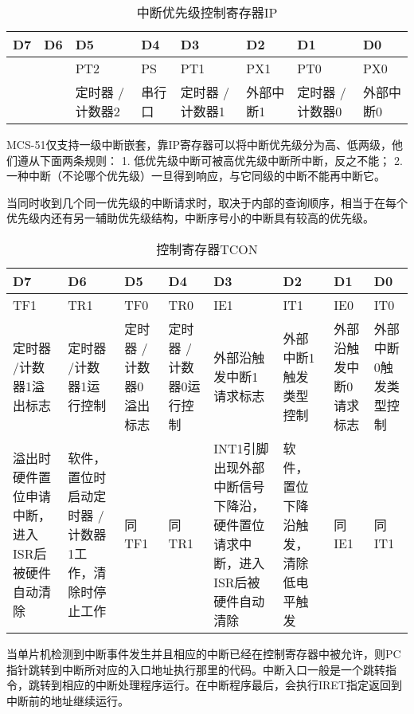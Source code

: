 \begin{spacing}{1.3}
\begin{table}[H]
\centering
\begin{tabular}{|p{1.5cm}<{\centering}|p{1.5cm}<{\centering}|p{1.8cm}<{\centering}|p{1.5cm}<{\centering}|p{1.8cm}<{\centering}|p{1.5cm}<{\centering}|p{1.8cm}<{\centering}|p{1.5cm}<{\centering}|}
\toprule
D7 & D6 & D5 & D4 & D3 & D2 & D1 & D0 \\
\midrule
 & & PT2 & PS & PT1 & PX1 & PT0 & PX0 \\
\midrule
 & & 定时器 /计数器2 & 串行口 & 定时器 /计数器1 & 外部中断1 & 定时器 /计数器0 & 外部中断0 \\
\bottomrule
\end{tabular}
\caption{中断优先级控制寄存器IP}
\end{table}

MCS-51仅支持一级中断嵌套，靠IP寄存器可以将中断优先级分为高、低两级，他们遵从下面两条规则：
1. 低优先级中断可被高优先级中断所中断，反之不能；
2. 一种中断（不论哪个优先级）一旦得到响应，与它同级的中断不能再中断它。

当同时收到几个同一优先级的中断请求时，取决于内部的查询顺序，相当于在每个优先级内还有另一辅助优先级结构，中断序号小的中断具有较高的优先级。

\begin{table}[H]
\centering
\begin{tabular}{|p{1.5cm}<{\centering}|p{1.5cm}<{\centering}|p{1.8cm}<{\centering}|p{1.5cm}<{\centering}|p{1.8cm}<{\centering}|p{1.5cm}<{\centering}|p{1.8cm}<{\centering}|p{1.5cm}<{\centering}|}
\toprule
D7 & D6 & D5 & D4 & D3 & D2 & D1 & D0 \\
\midrule
TF1 & TR1 & TF0 & TR0 & IE1 & IT1 & IE0 & IT0 \\
\midrule
定时器 /计数器1溢出标志 & 定时器 /计数器1运行控制 & 定时器 /计数器0溢出标志 & 定时器 /计数器0运行控制 & 外部沿触发中断1请求标志 & 外部中断1触发类型控制 & 外部沿触发中断0请求标志 & 外部中断0触发类型控制 \\
\midrule
溢出时硬件置位申请中断，进入ISR后被硬件自动清除 & 软件，置位时启动定时器 /计数器1工作，清除时停止工作 & 同TF1 & 同TR1 & INT1引脚出现外部中断信号下降沿，硬件置位请求中断，进入ISR后被硬件自动清除 & 软件，置位下降沿触发，清除低电平触发 & 同IE1 & 同IT1 \\
\bottomrule
\end{tabular}
\caption{控制寄存器TCON}
\end{table}

当单片机检测到中断事件发生并且相应的中断已经在控制寄存器中被允许，则PC指针跳转到中断所对应的入口地址执行那里的代码。中断入口一般是一个跳转指令，跳转到相应的中断处理程序运行。在中断程序最后，会执行IRET指定返回到中断前的地址继续运行。


\end{spacing}
